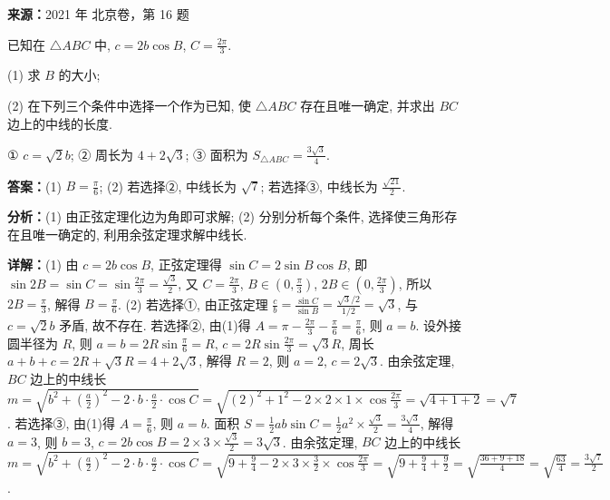 \begin{question}[points=13]
\textbf{来源：}2021 年 北京卷，第 16 题\par
已知在 $\triangle ABC$ 中, $c=2b\cos B$, $C=\frac{2\pi}{3}$.

(1) 求 $B$ 的大小;

(2) 在下列三个条件中选择一个作为已知, 使 $\triangle ABC$ 存在且唯一确定, 并求出 $BC$ 边上的中线的长度.

① $c=\sqrt{2}b$; ② 周长为 $4+2\sqrt{3}$; ③ 面积为 $S_{\triangle ABC}=\frac{3\sqrt{3}}{4}$.
\begin{solution}
\textbf{答案：}(1) $B=\frac{\pi}{6}$; (2) 若选择②, 中线长为 $\sqrt{7}$; 若选择③, 中线长为 $\frac{\sqrt{21}}{2}$.

\textbf{分析：}(1) 由正弦定理化边为角即可求解; (2) 分别分析每个条件, 选择使三角形存在且唯一确定的, 利用余弦定理求解中线长.

\textbf{详解：}(1) 由 $c=2b\cos B$, 正弦定理得 $\sin C=2\sin B\cos B$, 即 $\sin 2B=\sin C=\sin\frac{2\pi}{3}=\frac{\sqrt{3}}{2}$, 又 $C=\frac{2\pi}{3}$, $B\in(0,\frac{\pi}{3})$, $2B\in(0,\frac{2\pi}{3})$, 所以 $2B=\frac{\pi}{3}$, 解得 $B=\frac{\pi}{6}$.
(2) 若选择①, 由正弦定理 $\frac{c}{b}=\frac{\sin C}{\sin B}=\frac{\sqrt{3}/2}{1/2}=\sqrt{3}$, 与 $c=\sqrt{2}b$ 矛盾, 故不存在.
若选择②, 由(1)得 $A=\pi-\frac{2\pi}{3}-\frac{\pi}{6}=\frac{\pi}{6}$, 则 $a=b$. 设外接圆半径为 $R$, 则 $a=b=2R\sin\frac{\pi}{6}=R$, $c=2R\sin\frac{2\pi}{3}=\sqrt{3}R$, 周长 $a+b+c=2R+\sqrt{3}R=4+2\sqrt{3}$, 解得 $R=2$, 则 $a=2$, $c=2\sqrt{3}$. 由余弦定理, $BC$ 边上的中线长 $m=\sqrt{b^2+(\frac{a}{2})^2-2\cdot b\cdot\frac{a}{2}\cdot\cos C}=\sqrt{(2)^2+1^2-2\times2\times1\times\cos\frac{2\pi}{3}}=\sqrt{4+1+2}=\sqrt{7}$.
若选择③, 由(1)得 $A=\frac{\pi}{6}$, 则 $a=b$. 面积 $S=\frac{1}{2}ab\sin C=\frac{1}{2}a^2\times\frac{\sqrt{3}}{2}=\frac{3\sqrt{3}}{4}$, 解得 $a=3$, 则 $b=3$, $c=2b\cos B=2\times3\times\frac{\sqrt{3}}{2}=3\sqrt{3}$. 由余弦定理, $BC$ 边上的中线长 $m=\sqrt{b^2+(\frac{a}{2})^2-2\cdot b\cdot\frac{a}{2}\cdot\cos C}=\sqrt{9+\frac{9}{4}-2\times3\times\frac{3}{2}\times\cos\frac{2\pi}{3}}=\sqrt{9+\frac{9}{4}+\frac{9}{2}}=\sqrt{\frac{36+9+18}{4}}=\sqrt{\frac{63}{4}}=\frac{3\sqrt{7}}{2}$.
\end{solution}
\end{question}

